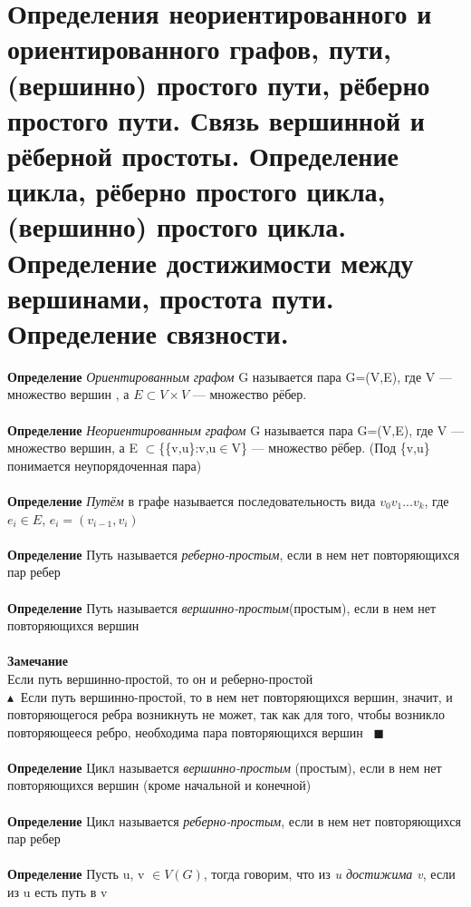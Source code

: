 \setcounter{section}{24}
\section{Определения неориентированного и ориентированного графов, пути, (вершинно) простого пути,
рёберно простого пути. Связь вершинной и рёберной простоты. Определение цикла, рёберно простого цикла, (вершинно) простого цикла. Определение достижимости между вершинами, простота
пути. Определение связности.}
\textbf{Определение} \textit{Ориентированным графом} G называется пара G=(V,E), где V — множество вершин , а $E \subset V\times V$ — множество рёбер.
\\
\\
\textbf{Определение} \textit{Неориентированным графом} G называется пара G=(V,E), где V — множество вершин, а E $\subset$\{\{v,u\}:v,u$\in$V\} — множество рёбер. (Под \{v,u\} понимается неупорядоченная пара)
\\
\\
\textbf{Определение} \textit{Путём} в графе называется последовательность вида $v_0v_1...v_k$, где $e_i\in E$, $e_i = (v_{i-1},v_i)$
\\
\\
\textbf{Определение} Путь называется \textit{реберно-простым}, если в нем нет повторяющихся пар ребер
\\
\\
\textbf{Определение} Путь называется \textit{вершинно-простым}(простым), если в нем нет повторяющихся вершин 
\\
\\
\textbf{Замечание}\\
Если путь вершинно-простой, то он и реберно-простой
\\ $\blacktriangle \ $ Если путь вершинно-простой, то в нем нет повторяющихся вершин, значит, и повторяющегося ребра возникнуть не может, так как для того, чтобы возникло повторяющееся ребро, необходима пара повторяющихся вершин \ $\blacksquare$
\\
\\
\textbf{Определение} Цикл называется \textit{вершинно-простым} (простым), если в нем нет повторяющихся вершин (кроме начальной и конечной) 
\\
\\
\textbf{Определение} Цикл называется \textit{реберно-простым}, если в нем нет повторяющихся пар ребер
\\
\\
\textbf{Определение} Пусть u, v $\in V(G)$, тогда говорим, что из \textit{u достижима v}, если из u есть путь в v
